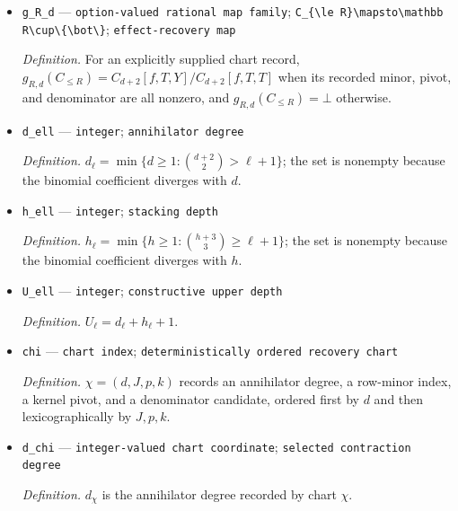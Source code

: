 \documentclass{article}
\begin{document}
\begin{itemize}
  \par\smallskip\noindent\emph{Definition.} For each explicitly supplied row-minor, kernel-pivot, and denominator record with \(1\le d\le R-2\), \(\Delta_{R,d}(C_{\le R})\) is their polynomial product on the entire cumulant-coordinate space; for an inadmissible record it is identically zero.
  \item \texttt{g\_\allowbreak{}R\_\allowbreak{}d} --- \texttt{option-\allowbreak{}valued rational map family}; \texttt{C\_\allowbreak{}\{\textbackslash{}\allowbreak{}le R\}\allowbreak{}\textbackslash{}\allowbreak{}mapsto\textbackslash{}\allowbreak{}mathbb R\textbackslash{}\allowbreak{}cup\textbackslash{}\allowbreak{}\{\textbackslash{}\allowbreak{}bot\textbackslash{}\allowbreak{}\}\allowbreak{}}; \texttt{effect-\allowbreak{}recovery map}
  \par\smallskip\noindent\emph{Definition.} For an explicitly supplied chart record, \(g_{R,d}(C_{\le R})=C_{d+2}[f,T,Y]/C_{d+2}[f,T,T]\) when its recorded minor, pivot, and denominator are all nonzero, and \(g_{R,d}(C_{\le R})=\bot\) otherwise.
  \item \texttt{d\_\allowbreak{}ell} --- \texttt{integer}; \texttt{annihilator degree}
  \par\smallskip\noindent\emph{Definition.} \(d_{\ell}=\min\{d\ge1:\binom{d+2}{2}>\ell+1\}\); the set is nonempty because the binomial coefficient diverges with \(d\).
  \item \texttt{h\_\allowbreak{}ell} --- \texttt{integer}; \texttt{stacking depth}
  \par\smallskip\noindent\emph{Definition.} \(h_{\ell}=\min\{h\ge1:\binom{h+3}{3}\ge\ell+1\}\); the set is nonempty because the binomial coefficient diverges with \(h\).
  \item \texttt{U\_\allowbreak{}ell} --- \texttt{integer}; \texttt{constructive upper depth}
  \par\smallskip\noindent\emph{Definition.} \(U_{\ell}=d_{\ell}+h_{\ell}+1\).
  \item \texttt{chi} --- \texttt{chart index}; \texttt{deterministically ordered recovery chart}
  \par\smallskip\noindent\emph{Definition.} \(\chi=(d,J,p,k)\) records an annihilator degree, a row-minor index, a kernel pivot, and a denominator candidate, ordered first by \(d\) and then lexicographically by \(J,p,k\).
  \item \texttt{d\_\allowbreak{}chi} --- \texttt{integer-\allowbreak{}valued chart coordinate}; \texttt{selected contraction degree}
  \par\smallskip\noindent\emph{Definition.} \(d_{\chi}\) is the annihilator degree recorded by chart \(\chi\).

\end{itemize}
\end{document}
